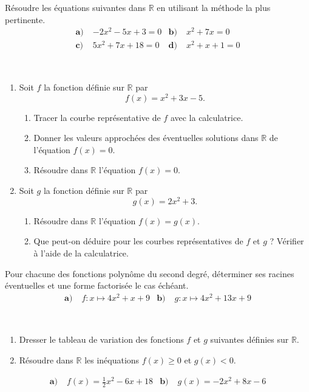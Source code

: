 \documentclass[11pt]{article}
\begin{document}
\begin{exo}
  Résoudre les équations suivantes dans $\mathbb{R}$ en utilisant la méthode la
  plus pertinente.
  \begin{align*}
    \textbf{a)}\;& -2x^2 - 5x +3 = 0 &
    \textbf{b)}\;& x^2 + 7x = 0 \\
    \textbf{c)}\;& 5x^2 + 7x +18 = 0 &
    \textbf{d)}\;& x^2 +x +1 = 0
  \end{align*}
\end{exo}
\newpage
\begin{exo}~
  \begin{enumerate}
    \item Soit $f$ la fonction définie sur $\mathbb{R}$ par
      \[
        f(x) = x^2+3x-5.
      \]
      \begin{enumerate}
        \item Tracer la courbe représentative de $f$ avec la calculatrice.
        \item Donner les valeurs approchées des éventuelles solutions dans
          $\mathbb{R}$ de l'équation $f(x)=0$.
        \item Résoudre dans $\mathbb{R}$ l'équation $f(x)=0$.
      \end{enumerate}
    \item Soit $g$ la fonction définie sur $\mathbb{R}$ par
      \[
        g(x) = 2x^2+3.
      \]
      \begin{enumerate}
        \item Résoudre dans $\mathbb{R}$ l'équation $f(x)=g(x)$.
        \item Que peut-on déduire pour les courbes représentatives de $f$ et $g$
          ? Vérifier à l'aide de la calculatrice.
      \end{enumerate}
  \end{enumerate}
\end{exo}

\begin{exo}
  Pour chacune des fonctions polynôme du second degré, déterminer ses racines
  éventuelles et une forme factorisée le cas échéant.
  \begin{align*}
    \textbf{a)}&\; f:x\mapsto 4x^2+x+9 &
    \textbf{b)}&\; g:x\mapsto 4x^2+13x+9
  \end{align*}
\end{exo}

\begin{exo}~
  \begin{enumerate}
    \item Dresser le tableau de variation des fonctions $f$ et $g$ suivantes définies
  sur $\mathbb{R}$.
\item Résoudre dans $\mathbb{R}$ les inéquations $f(x)\geq0$ et $g(x)<0$.
  \end{enumerate}
  \begin{align*}
    \textbf{a)}&\; f(x) = \frac{1}{2}x^2-6x+18 &
    \textbf{b)}&\; g(x) = -2x^2+8x-6
  \end{align*}
\end{exo}
\end{document}
